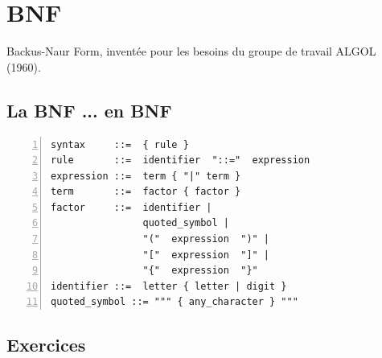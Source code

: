 \documentclass[twoside,11pt]{article}
\begin{document}
\maketitle

\section{BNF}

Backus-Naur Form, inventée pour les besoins du groupe de travail ALGOL (1960).

\subsection{La BNF ... en BNF}

\begin{lstlisting}[frame=single, numbers=left]
syntax     ::=  { rule }
rule       ::=  identifier  "::="  expression
expression ::=  term { "|" term }
term       ::=  factor { factor }
factor     ::=  identifier |
                quoted_symbol |
                "("  expression  ")" |
                "["  expression  "]" |
                "{"  expression  "}"
identifier ::=  letter { letter | digit }
quoted_symbol ::= """ { any_character } """
\end{lstlisting}

\subsection{Exercices}
\end{document}
